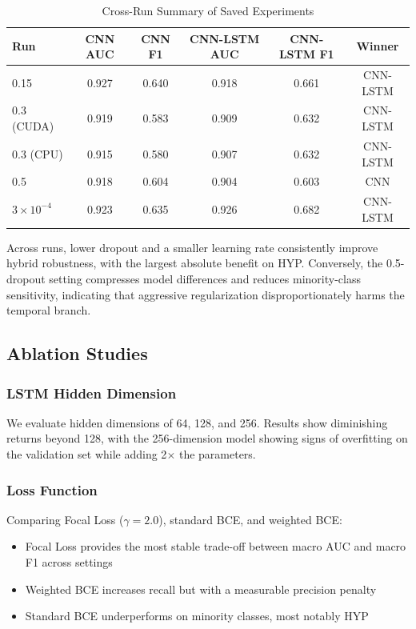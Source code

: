 \documentclass[conference]{IEEEtran}
\begin{document}
\begin{table}[htbp]
\centering
\scriptsize
\caption{Cross-Run Summary of Saved Experiments}
\label{tab:cross_run}
\begin{tabular}{lccccc}
\toprule
\textbf{Run} & \textbf{CNN AUC} & \textbf{CNN F1} & \textbf{CNN-LSTM AUC} & \textbf{CNN-LSTM F1} & \textbf{Winner} \\
\midrule
0.15 & 0.927 & 0.640 & 0.918 & 0.661 & CNN-LSTM \\
0.3 (CUDA) & 0.919 & 0.583 & 0.909 & 0.632 & CNN-LSTM \\
0.3 (CPU) & 0.915 & 0.580 & 0.907 & 0.632 & CNN-LSTM \\
0.5 & 0.918 & 0.604 & 0.904 & 0.603 & CNN \\
$3\times10^{-4}$ & 0.923 & 0.635 & 0.926 & 0.682 & CNN-LSTM \\
\bottomrule
\end{tabular}
\end{table}

Across runs, lower dropout and a smaller learning rate consistently improve hybrid robustness, with the largest absolute benefit on HYP. Conversely, the 0.5-dropout setting compresses model differences and reduces minority-class sensitivity, indicating that aggressive regularization disproportionately harms the temporal branch.

\subsection{Ablation Studies}

\subsubsection{LSTM Hidden Dimension}

We evaluate hidden dimensions of 64, 128, and 256. Results show diminishing returns beyond 128, with the 256-dimension model showing signs of overfitting on the validation set while adding 2$\times$ the parameters.

\subsubsection{Loss Function}

Comparing Focal Loss ($\gamma=2.0$), standard BCE, and weighted BCE:
\begin{itemize}
    \item Focal Loss provides the most stable trade-off between macro AUC and macro F1 across settings
    \item Weighted BCE increases recall but with a measurable precision penalty
    \item Standard BCE underperforms on minority classes, most notably HYP
\end{itemize}
\end{document}
